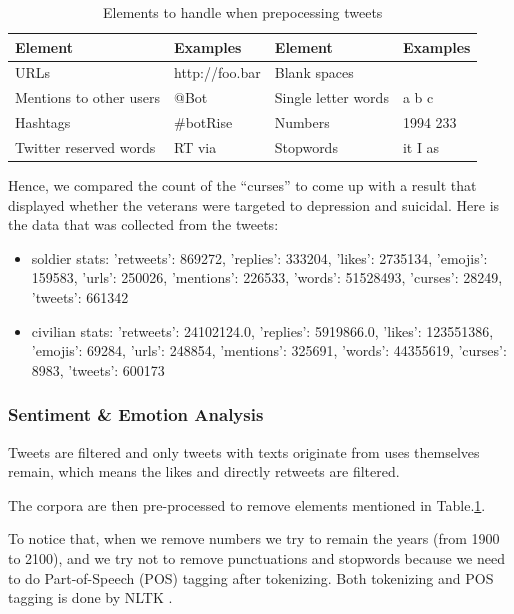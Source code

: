 \begin{table}[h]
  \caption{Elements to handle when prepocessing tweets}
  \label{table:elementsRemoved}
  \centering
  \renewcommand{\tabularxcolumn}{m} %
  \begin{tabularx}{\textwidth}{l  l || l  l}
    \toprule
    \textbf{Element} & \textbf{Examples} & \textbf{Element}    & \textbf{Examples}
    \tabularnewline \midrule
    URLs
                     &
    http://foo.bar   & Blank spaces      &
    \tabularnewline \hline
    Mentions to other users
                     & @Bot              & Single letter words & a b c
    \tabularnewline \hline
    Hashtags
                     & \#botRise         & Numbers             & 1994 233
    \tabularnewline \hline
    Twitter reserved words
                     & RT via            & Stopwords
                     & it I as
    \tabularnewline \bottomrule
  \end{tabularx}
\end{table}

Hence, we compared the count of the “curses” to come up with a result that displayed whether the veterans were targeted to depression and suicidal. Here is the data that was collected from the tweets:

\begin{itemize}
  \item soldier stats: {'retweets': 869272, 'replies': 333204, 'likes': 2735134, 'emojis': 159583, 'urls': 250026, 'mentions': 226533, 'words': 51528493, 'curses': 28249, 'tweets': 661342}
  \item civilian stats: {'retweets': 24102124.0, 'replies': 5919866.0, 'likes': 123551386, 'emojis': 69284, 'urls': 248854, 'mentions': 325691, 'words': 44355619, 'curses': 8983, 'tweets': 600173}
\end{itemize}

\subsubsection{Sentiment \& Emotion Analysis}

Tweets are filtered and only tweets with texts originate from uses themselves remain, which means the likes and directly retweets are filtered.

The corpora are then pre-processed to remove elements mentioned in Table.\ref{table:elementsRemoved}.

To notice that, when we remove numbers we try to remain the years (from 1900 to 2100), and we try not to remove punctuations and stopwords because we need to do Part-of-Speech (POS) tagging after tokenizing. Both tokenizing and POS tagging is done by NLTK \citep{NLTK}.


